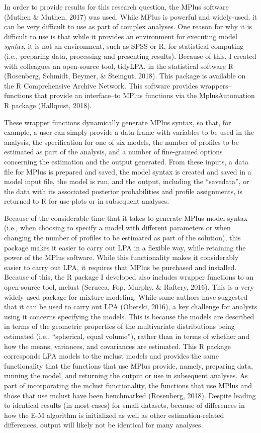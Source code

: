 \documentclass[]{book}
\theoremstyle{definition}
\theoremstyle{definition}
\theoremstyle{definition}
\theoremstyle{remark}
\begin{document}
In order to provide results for this research question, the MPlus
software (Muthen \& Muthen, 2017) was used. While MPlus is powerful and
widely-used, it can be very difficult to use as part of complex
analyses. One reason for why it is difficult to use is that while it
provides an environment for executing model \emph{syntax}, it is not an
environment, such as SPSS or R, for statistical computing (i.e.,
preparing data, processing and presenting results). Because of this, I
created with colleagues an open-source tool, tidyLPA, in the statistical
software R (Rosenberg, Schmidt, Beymer, \& Steingut, 2018). This package
is available on the R Comprehensive Archive Network. This software
provides wrappers--functions that provide an interface--to MPlus
functions via the MplusAutomation R package (Hallquist, 2018).

These wrapper functions dynamically generate MPlus syntax, so that, for
example, a user can simply provide a data frame with variables to be
used in the analysis, the specification for one of six models, the
number of profiles to be estimated as part of the analysis, and a number
of fine-grained options concerning the estimation and the output
generated. From these inputs, a data file for MPlus is prepared and
saved, the model syntax is created and saved in a model input file, the
model is run, and the output, including the ``savedata'', or the data
with its associated posterior probabilities and profile assignments, is
returned to R for use plots or in subsequent analyses.

Because of the considerable time that it takes to generate MPlus model
syntax (i.e., when choosing to specify a model with different parameters
or when changing the number of profiles to be estimated as part of the
solution), this package makes it easier to carry out LPA in a flexible
way, while retaining the power of the MPlus software. While this
functionality makes it considerably easier to carry out LPA, it requires
that MPlus be purchased and installed. Because of this, the R package I
developed also includes wrapper functions to an open-source tool, mclust
(Scrucca, Fop, Murphy, \& Raftery, 2016). This is a very widely-used
package for mixture modeling. While some authors have suggested that it
can be used to carry out LPA (Oberski, 2016), a key challenge for
analysts using it concerns specifying the models. This is because the
models are described in terms of the geometric properties of the
multivariate distributions being estimated (i.e., ``spherical, equal
volume''), rather than in terms of whether and how the means, variances,
and covariances are estimated. This R package corresponds LPA models to
the mclust models and provides the same functionality that the functions
that use MPlus provide, namely, preparing data, running the model, and
returning the output or use in subsequent analyses. As part of
incorporating the mclust functionality, the functions that use MPlus and
those that use mclust have been benchmarked (Rosenberg, 2018). Despite
leading to identical results (in most cases) for small datasets, because
of differences in how the E-M algorithm is initialized as well as other
estimation-related differences, output will likely not be identical for
many analyses.
\end{document}
